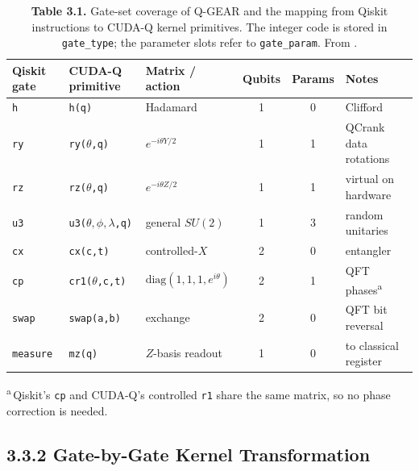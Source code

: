 \documentclass{report}
\theoremstyle{plain}
\theoremstyle{definition}
\theoremstyle{remark}
\begin{document}
\begin{table}[htbp]
\caption{\textbf{Table 3.1.} Gate-set coverage of Q-GEAR and the mapping from Qiskit instructions to CUDA-Q kernel primitives. The integer code is stored in \texttt{gate\_type}; the parameter slots refer to \texttt{gate\_param}. From \cite{guo2025qgear,guo2025qgearsoftware}.}
\label{tab:qgear:gates}
 \small

\begin{tabular}{lllccl}
\toprule
Qiskit gate & CUDA-Q primitive & Matrix / action & Qubits & Params & Notes \\
\midrule
\texttt{h}       & \texttt{h(q)}                    & Hadamard                          & 1 & 0 & Clifford \\
\texttt{ry}      & \texttt{ry(\(\theta\),q)}        & $e^{-i\theta Y/2}$                & 1 & 1 & QCrank data rotations \\
\texttt{rz}      & \texttt{rz(\(\theta\),q)}        & $e^{-i\theta Z/2}$                & 1 & 1 & virtual on hardware \\
\texttt{u3}      & \texttt{u3(\(\theta,\phi,\lambda\),q)} & general $SU(2)$             & 1 & 3 & random unitaries \\
\texttt{cx}      & \texttt{cx(c,t)}                 & controlled-$X$                    & 2 & 0 & entangler \\
\texttt{cp}      & \texttt{cr1(\(\theta\),c,t)}     & $\mathrm{diag}(1,1,1,e^{i\theta})$ & 2 & 1 & QFT phases\textsuperscript{a} \\
\texttt{swap}    & \texttt{swap(a,b)}               & exchange                          & 2 & 0 & QFT bit reversal \\
\texttt{measure} & \texttt{mz(q)}                   & $Z$-basis readout                 & 1 & 0 & to classical register \\
\bottomrule
\end{tabular}
\begin{tablenotes}
\textsuperscript{a} Qiskit's \texttt{cp} and CUDA-Q's controlled \texttt{r1} share the same matrix, so no phase correction is needed.
\end{tablenotes}

\end{table}

\subsection{3.3.2 Gate-by-Gate Kernel Transformation}\label{sec:qgear:kernel}
\end{document}
